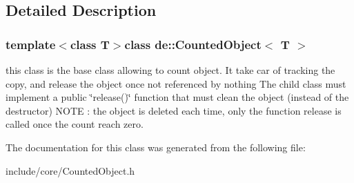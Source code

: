 \subsection{\-Detailed \-Description}
\subsubsection*{template$<$class \-T$>$class de\-::\-Counted\-Object$<$ T $>$}

this class is the base class allowing to count object. \-It take car of tracking the copy, and release the object once not referenced by nothing \-The child class must implement a public \char`\"{}release()\char`\"{} function that must clean the object (instead of the destructor) \-N\-O\-T\-E \-: the object is deleted each time, only the function release is called once the count reach zero. 

\-The documentation for this class was generated from the following file\-:\begin{DoxyCompactItemize}
\item 
include/core/\-Counted\-Object.\-h\end{DoxyCompactItemize}
